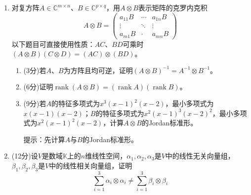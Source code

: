 \documentclass[a4paper,UTF8,fontset=windows,AutoFakeBold]{ctexart}
\DeclareMathOperator{\rank}{rank}
\begin{document}
\begin{enumerate}
    \item 对复方阵$A\in\mathbb{C}^{m\times n}$、$B\in\mathbb{C}^{p\times q}$，用$A\otimes B$表示矩阵的克罗内克积
    $$A\otimes B=\begin{pmatrix}a_{11}B&\cdots& a_{1n}B\\\vdots&\ddots&\vdots\\a_{m1}B&\cdot&a_{mn}B\end{pmatrix}$$
    以下题目可直接使用性质：$AC$、$BD$可乘时$(A\otimes B)(C\otimes D)=(AC)\otimes(BD)$。
    \begin{enumerate}
        \item (3分)若$A$、$B$为方阵且均可逆，证明$(A\otimes B)^{-1}=A^{-1}\otimes B^{-1}$。
        \item (6分)证明$\rank(A\otimes B)=(\rank A)(\rank B)$。
        \item (9分)若$A$的特征多项式为$x^3(x-1)^2(x-2)$，最小多项式为$x(x-1)(x-2)$；$B$的特征多项式为$x^2(x-1)^3(x-2)^2$，最小多项式为$x^2(x-1)^2(x-2)$，计算$A\otimes B$的Jordan标准形。
        
        提示：先计算$A$与$B$的Jordan标准形。
    \end{enumerate}

    \item (12分)设$V$是数域$\mathbb{K}$上的$n$维线性空间，$\alpha_1,\alpha_2,\alpha_3$是$V$中的线性无关向量组，$\beta_1,\beta_2,\beta_3$是$V$中的线性相关向量组，证明
    $$\sum_{i=1}^3\alpha_i\otimes\alpha_i\ne\sum_{i=1}^3\beta_i\otimes\beta_i$$
\end{enumerate}
\end{document}
